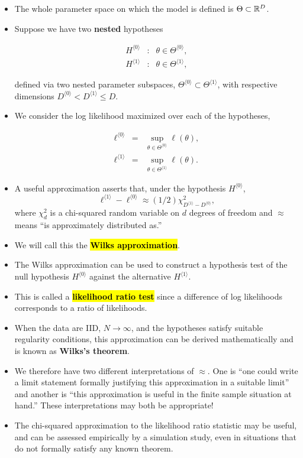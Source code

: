 \documentclass[]{article}
\begin{document}
\begin{itemize}
\item
  The whole parameter space on which the model is defined is
  \(\Theta\subset\mathbb{R}^D\).
\item
  Suppose we have two \textbf{nested} hypotheses

  \begin{eqnarray}
  H^{\langle 0\rangle} &:& \theta\in \Theta^{\langle 0\rangle},
  \\
  H^{\langle 1\rangle} &:& \theta\in \Theta^{\langle 1\rangle},
  \end{eqnarray}

  defined via two nested parameter subspaces,
  \(\Theta^{\langle 0\rangle}\subset \Theta^{\langle 1\rangle}\), with
  respective dimensions
  \(D^{\langle 0\rangle}< D^{\langle 1\rangle}\le D\).
\item
  We consider the log likelihood maximized over each of the hypotheses,

  \begin{eqnarray}
  \ell^{\langle 0\rangle} &=& \sup_{\theta\in \Theta^{\langle 0\rangle}} \ell(\theta),
  \\
  \ell^{\langle 1\rangle} &=& \sup_{\theta\in \Theta^{\langle 1\rangle}} \ell(\theta).
  \end{eqnarray}
\item
  A useful approximation asserts that, under the hypothesis
  \(H^{\langle 0\rangle}\), \[ 
  \ell^{\langle 1\rangle} - \ell^{\langle 0\rangle} \approx (1/2) \chi^2_{D^{\langle 1\rangle}- D^{\langle 0\rangle}},
  \] where \(\chi^2_d\) is a chi-squared random variable on \(d\)
  degrees of freedom and \(\approx\) means ``is approximately
  distributed as.''
\item
  We will call this the \hl{\textbf{Wilks approximation}}.
\item
  The Wilks approximation can be used to construct a hypothesis test of
  the null hypothesis \(H^{\langle 0\rangle}\) against the alternative
  \(H^{\langle 1\rangle}\).
\item
  This is called a \hl{\textbf{likelihood ratio test}} since a difference of
  log likelihoods corresponds to a ratio of likelihoods.
\item
  When the data are IID, \(N\to\infty\), and the hypotheses satisfy
  suitable regularity conditions, this approximation can be derived
  mathematically and is known as \textbf{Wilks's theorem}.
\item
  We therefore have two different interpretations of \(\approx\). One is
  ``one could write a limit statement formally justifying this
  approximation in a suitable limit'' and another is ``this
  approximation is useful in the finite sample situation at hand.''
  These interpretations may both be appropriate!
\item
  The chi-squared approximation to the likelihood ratio statistic may be
  useful, and can be assessed empirically by a simulation study, even in
  situations that do not formally satisfy any known theorem.
\end{itemize}
\end{document}
